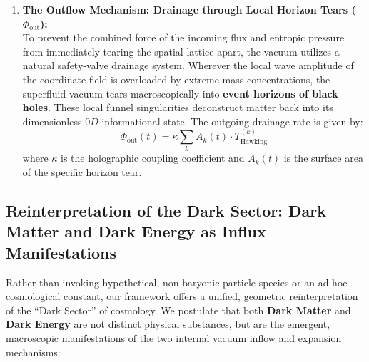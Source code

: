 \documentclass[11pt,a4paper]{article}
\theoremstyle{plain}
\theoremstyle{definition}
\theoremstyle{remark}
\begin{document}
\begin{enumerate}
    \item \textbf{The Outflow Mechanism: Drainage through Local Horizon Tears ($\Phi_{\text{out}}$):} \\
    To prevent the combined force of the incoming flux and entropic pressure from immediately tearing the spatial lattice apart, the vacuum utilizes a natural safety-valve drainage system. Wherever the local wave amplitude of the coordinate field is overloaded by extreme mass concentrations, the superfluid vacuum tears macroscopically into \textbf{event horizons of black holes}. These local funnel singularities deconstruct matter back into its dimensionless $0D$ informational state. The outgoing drainage rate is given by:
    \begin{equation}
    \Phi_{\text{out}}(t) = \kappa \sum_{k} A_k(t) \cdot T_{\text{Hawking}}^{(k)}
    \end{equation}
    where $\kappa$ is the holographic coupling coefficient and $A_k(t)$ is the surface area of the specific horizon tear.
\end{enumerate}

\newpage
\subsection{Reinterpretation of the Dark Sector: Dark Matter and Dark Energy as Influx Manifestations}
Rather than invoking hypothetical, non-baryonic particle species or an ad-hoc cosmological constant, our framework offers a unified, geometric reinterpretation of the ``Dark Sector'' of cosmology. We postulate that both \textbf{Dark Matter} and \textbf{Dark Energy} are not distinct physical substances, but are the emergent, macroscopic manifestations of the two internal vacuum inflow and expansion mechanisms:
\end{document}
